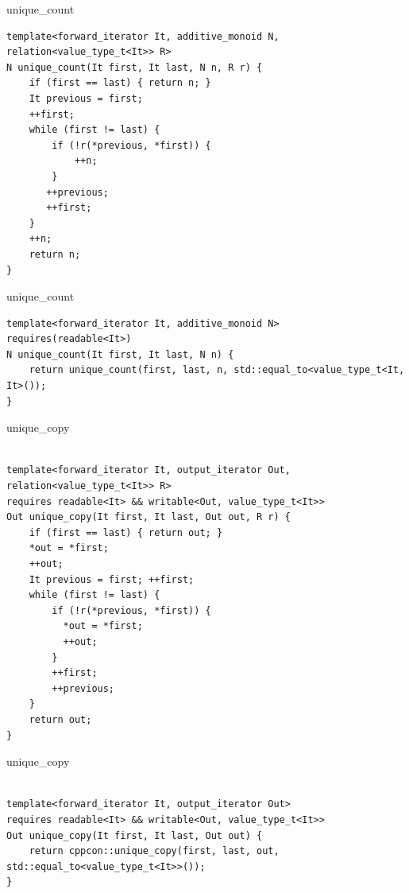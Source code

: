 \documentclass[10pt]{beamer}
\begin{document}
\begin{frame}[fragile]{unique\_count}
\begin{lstlisting}[style=cpp]
template<forward_iterator It, additive_monoid N, relation<value_type_t<It>> R>
N unique_count(It first, It last, N n, R r) {
    if (first == last) { return n; }
    It previous = first;
    ++first;
    while (first != last) {
        if (!r(*previous, *first)) {
            ++n;
        }
       ++previous;
       ++first;
    }
    ++n;
    return n;
}

\end{lstlisting}
\end{frame}


\begin{frame}[fragile]{unique\_count}
\begin{lstlisting}[style=cpp]
template<forward_iterator It, additive_monoid N>
requires(readable<It>)
N unique_count(It first, It last, N n) {
    return unique_count(first, last, n, std::equal_to<value_type_t<It, It>());
}
\end{lstlisting}
\end{frame}

\begin{frame}[fragile]{unique\_copy}
\begin{lstlisting}[style=cpp]

template<forward_iterator It, output_iterator Out, relation<value_type_t<It>> R>
requires readable<It> && writable<Out, value_type_t<It>>
Out unique_copy(It first, It last, Out out, R r) {
    if (first == last) { return out; }
    *out = *first;  
    ++out;
    It previous = first; ++first;
    while (first != last) {
        if (!r(*previous, *first)) {
          *out = *first;
          ++out;
        }
        ++first;
        ++previous;
    }
    return out;
}

\end{lstlisting}
\end{frame}

\begin{frame}[fragile]{unique\_copy}
\begin{lstlisting}[style=cpp]

template<forward_iterator It, output_iterator Out>
requires readable<It> && writable<Out, value_type_t<It>>
Out unique_copy(It first, It last, Out out) {
    return cppcon::unique_copy(first, last, out, std::equal_to<value_type_t<It>>());
}

\end{lstlisting}
\end{frame}
\end{document}

